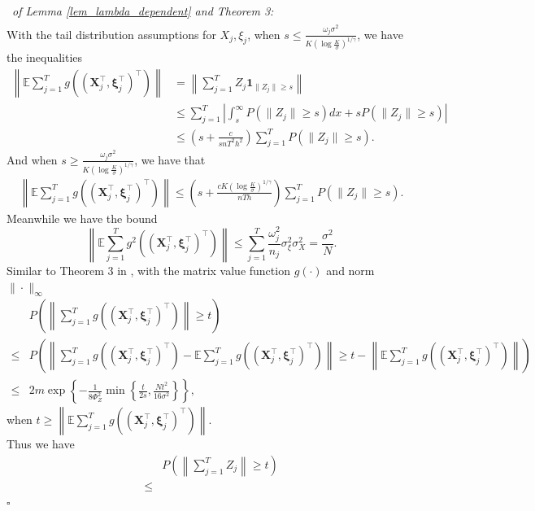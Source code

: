 \documentclass[12pt]{article}
\newenvironment{pf}{{\noindent\it Proof}\ }{\hfill $\square$\par}
\begin{document}
\begin{pf}{\it of Lemma \ref{lem_lambda_dependent} and Theorem 3:}
\begin{align*}
  \end{align*}
  With the tail distribution assumptions for $X_j,\xi_j$, when $s \le \frac{\omega_j\sigma^2}{K(\log\frac{K}{\sigma})^{1/\gamma}}$, we have the inequalities
  \begin{align*}
  \left\| \mathbb{E}\sum_{j=1}^T g((\mathbf{X}_j^\top,\mathbf{\xi}_j^\top)^\top)\right\| &= \left\|\sum_{j=1}^T Z_j \mathbf{1}_{\|Z_j\|\ge s} \right\|\\& \le \sum_{j=1}^T\left|
  \int_{s}^\infty P(\|Z_j\|\ge s) d x + s P(\|Z_j\|\ge s) \right| \\& \le \left(s+\frac{c} {s n T^2h^2}\right) \sum_{j=1}^T P(\|Z_j\|\ge s).
  \end{align*}
  And when $s \ge \frac{\omega_j\sigma^2}{K(\log\frac{K}{\sigma})^{1/\gamma}}$, we have that 
  \begin{align*}
  \left\| \mathbb{E}\sum_{j=1}^T g((\mathbf{X}_j^\top,\mathbf{\xi}_j^\top)^\top)\right\| \le \left(s + \frac{c K(\log \frac{K}{\sigma})^{1/\gamma}}{nTh}\right)\sum_{j=1}^T P(\|Z_j\|\ge s).
  \end{align*}
  Meanwhile we have the bound
  \begin{equation*}
  \left\|\mathbb{E}\sum_{j=1}^T g^2((\mathbf{X}_j^\top,\mathbf{\xi}_j^\top)^\top)\right\| \le \sum_{j=1}^T \frac{\omega_j^2}{n_j} \sigma_\xi^2\sigma_X^2 = \frac{\sigma^2}{N}.
  \end{equation*}
  Similar to Theorem 3 in \cite{samson2000concentration}, with the matrix value function $g(\cdot)$ and norm $\|\cdot\|_{\infty}$
  \begin{align*}
  & P\left(\left\|\sum_{j=1}^T g((\mathbf{X}_j^\top,\mathbf{\xi}_j^\top)^\top)\right\|\ge t\right) \\\le &P\left(\left\|\sum_{j=1}^T g((\mathbf{X}_j^\top,\mathbf{\xi}_j^\top)^\top) - \mathbb{E}\sum_{j=1}^T g((\mathbf{X}_j^\top,\mathbf{\xi}_j^\top)^\top)\right\|\ge t- \left\| \mathbb{E}\sum_{j=1}^T g((\mathbf{X}_j^\top,\mathbf{\xi}_j^\top)^\top)\right\|\right)\\ \le &
  2m \exp\left\{-\frac{1}{8\Phi_Z^2}\min\left\{\frac{t}{2s},\frac{N t^2}{16\sigma^2}\right\}\right\},
  \end{align*}
  when $t \ge  \left\| \mathbb{E}\sum_{j=1}^T g((\mathbf{X}_j^\top,\mathbf{\xi}_j^\top)^\top)\right\|$.\\
  Thus we have 
  \begin{equation*}
  \begin{aligned}
  &P\left(\left\|\sum_{j=1}^T Z_{j}\right\|\ge t \right) \\ \le&

\end{aligned}
\end{equation*}
\end{pf}
\end{document}
